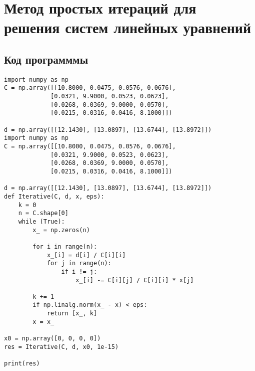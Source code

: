 \documentclass[12pt,a4paper]{article}
\begin{document}
\section{Метод простых итераций для решения систем линейных уравнений}
\subsection{Код программмы}
\begin{verbatim}
import numpy as np
C = np.array([[10.8000, 0.0475, 0.0576, 0.0676],
             [0.0321, 9.9000, 0.0523, 0.0623],
             [0.0268, 0.0369, 9.0000, 0.0570],
             [0.0215, 0.0316, 0.0416, 8.1000]])

d = np.array([[12.1430], [13.0897], [13.6744], [13.8972]])
import numpy as np
C = np.array([[10.8000, 0.0475, 0.0576, 0.0676],
             [0.0321, 9.9000, 0.0523, 0.0623],
             [0.0268, 0.0369, 9.0000, 0.0570],
             [0.0215, 0.0316, 0.0416, 8.1000]])

d = np.array([[12.1430], [13.0897], [13.6744], [13.8972]])
def Iterative(C, d, x, eps):
    k = 0
    n = C.shape[0]
    while (True):
        x_ = np.zeros(n)

        for i in range(n):
            x_[i] = d[i] / C[i][i]
            for j in range(n):
                if i != j:
                    x_[i] -= C[i][j] / C[i][i] * x[j]

        k += 1
        if np.linalg.norm(x_ - x) < eps:
            return [x_, k]
        x = x_

x0 = np.array([0, 0, 0, 0])
res = Iterative(C, d, x0, 1e-15)

print(res)
\end{verbatim}
\end{document}
